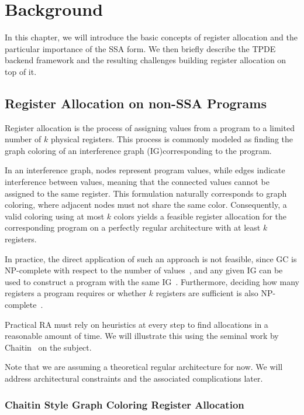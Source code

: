 \chapter{Background}
\label{ch:background}
In this chapter, we will introduce the basic concepts of register allocation and the particular importance of the SSA form. We then briefly describe the TPDE backend framework and the resulting challenges building register allocation on top of it.

\section{Register Allocation on non-SSA Programs}
\label{sec:regalloc-non-ssa}

Register allocation is the process of assigning values from a program to a limited number of $k$ physical registers. This process is commonly modeled as finding the graph coloring of an interference graph (IG)corresponding to the program.

In an interference graph, nodes represent program values, while edges indicate interference between values, meaning that the connected values cannot be assigned to the same register. This formulation naturally corresponds to graph coloring, where adjacent nodes must not share the same color. Consequently, a valid coloring using at most $k$ colors yields a feasible register allocation for the corresponding program on a perfectly regular architecture with at least $k$ registers.

In practice, the direct application of such an approach is not feasible, since GC is NP-complete with respect to the number of values~\cite{graph-coloring-np-complete}, and any given IG can be used to construct a program with the same IG~\cite{chaitin1981}. 
Furthermore, deciding how many registers a program requires or whether $k$ registers are sufficient is also NP-complete~\cite{hack-thesis}.


Practical RA must rely on heuristics at every step to find allocations in a reasonable
amount of time. We will illustrate this using the seminal work by Chaitin~\cite{chaitin1981} on the subject.

Note that we are assuming a theoretical regular architecture for now. We will address architectural constraints and the associated complications later.

\subsection{Chaitin Style Graph Coloring Register Allocation}

